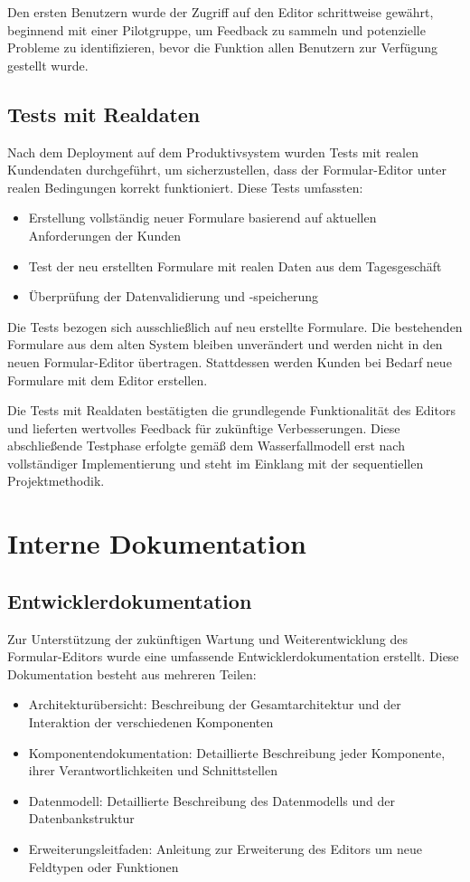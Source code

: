 \documentclass[a4paper,11pt]{article}
\begin{document}
\noindent Den ersten Benutzern wurde der Zugriff auf den Editor schrittweise gewährt, beginnend mit einer Pilotgruppe, um Feedback zu sammeln und potenzielle Probleme zu identifizieren, bevor die Funktion allen Benutzern zur Verfügung gestellt wurde.

\subsection{Tests mit Realdaten}
Nach dem Deployment auf dem Produktivsystem wurden Tests mit realen Kundendaten durchgeführt, um sicherzustellen, dass der Formular-Editor unter realen Bedingungen korrekt funktioniert. Diese Tests umfassten:

\begin{itemize}
  \item Erstellung vollständig neuer Formulare basierend auf aktuellen Anforderungen der Kunden
  \item Test der neu erstellten Formulare mit realen Daten aus dem Tagesgeschäft
  \item Überprüfung der Datenvalidierung und -speicherung
\end{itemize}

\noindent Die Tests bezogen sich ausschließlich auf neu erstellte Formulare. Die bestehenden Formulare aus dem alten System bleiben unverändert und werden nicht in den neuen Formular-Editor übertragen. Stattdessen werden Kunden bei Bedarf neue Formulare mit dem Editor erstellen.

\noindent Die Tests mit Realdaten bestätigten die grundlegende Funktionalität des Editors und lieferten wertvolles Feedback für zukünftige Verbesserungen. Diese abschließende Testphase erfolgte gemäß dem Wasserfallmodell erst nach vollständiger Implementierung und steht im Einklang mit der sequentiellen Projektmethodik.

\section{Interne Dokumentation}
\subsection{Entwicklerdokumentation}
Zur Unterstützung der zukünftigen Wartung und Weiterentwicklung des Formular-Editors wurde eine umfassende Entwicklerdokumentation erstellt. Diese Dokumentation besteht aus mehreren Teilen:

\begin{itemize}
  \item Architekturübersicht: Beschreibung der Gesamtarchitektur und der Interaktion der verschiedenen Komponenten
  \item Komponentendokumentation: Detaillierte Beschreibung jeder Komponente, ihrer Verantwortlichkeiten und Schnittstellen
  \item Datenmodell: Detaillierte Beschreibung des Datenmodells und der Datenbankstruktur
  \item Erweiterungsleitfaden: Anleitung zur Erweiterung des Editors um neue Feldtypen oder Funktionen
\end{itemize}
\end{document}
